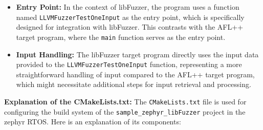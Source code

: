 \begin{itemize}
    \item \textbf{Entry Point:} In the context of libFuzzer, the program uses a function
    named \texttt{LLVMFuzzerTestOneInput} as the entry point,
    which is specifically designed for integration with libFuzzer.
    This contrasts with the AFL++ target program, where the
    \texttt{main} function serves as the entry point.
    \item \textbf{Input Handling:} The libFuzzer target program directly uses
    the input data provided to the \texttt{LLVMFuzzerTestOneInput} function,
    representing a more straightforward handling of input compared to the
    AFL++ target program, which might necessitate additional steps for input
    retrieval and processing.
\end{itemize}

\textbf{Explanation of the CMakeLists.txt:}
The \texttt{CMakeLists.txt} file is used for configuring the build system
of the \texttt{sample\_zephyr\_libFuzzer} project in the zephyr RTOS.
Here is an explanation of its components:

